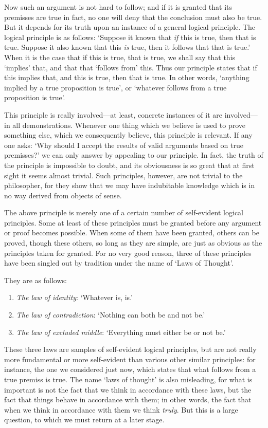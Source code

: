 \documentclass[oneside,letterpaper,12pt]{book}
\begin{document}
Now such an argument is not hard to follow; and if it is granted that
its premisses are true in fact, no one will deny that the conclusion
must also be true. But it depends for its truth upon an instance of a
general logical principle. The logical principle is as follows:
`Suppose it known that \emph{if} this is true, then that
is true. Suppose it also known that this \emph{is} true, then it follows
that that is true.' When it is the case that if this is
true, that is true, we shall say that this
`implies' that, and that that
`follows from' this. Thus our principle
states that if this implies that, and this is true, then that is true.
\label{mp} In other words, `anything implied by a true proposition
is true', or `whatever follows from a
true proposition is true'.

This principle is really involved---at least, concrete instances of it
are involved---in all demonstrations. Whenever one thing which we
believe is used to prove something else, which we consequently believe,
this principle is relevant. If any one asks: `Why should
I accept the results of valid arguments based on true
premisses?' we can only answer by appealing to our
principle. In fact, the truth of the principle is impossible to doubt,
and its obviousness is so great that at first sight it seems almost
trivial. Such principles, however, are not trivial to the philosopher,
for they show that we may have indubitable knowledge which is in no way
derived from objects of sense.

The above principle is merely one of a certain number of self-evident
logical principles. Some at least of these principles must be granted
before any argument or proof becomes possible. When some of them have
been granted, others can be proved, though these others, so long as they
are simple, are just as obvious as the principles taken for granted. For
no very good reason, three of these principles have been singled out by
tradition under the name of `Laws of
Thought'.

They are as follows:
\begin{enumerate}
	\item \label{identity} \emph{The law of identity}: `Whatever is,
is.'
	\item \label{lnc} \emph{The law of contradiction}: `Nothing can both
be and not be.'
	\item \label{lem} \emph{The law of excluded middle}: `Everything must
either be or not be.'
\end{enumerate}
These three laws are samples of self-evident logical principles, but are
not really more fundamental or more self-evident than various other
similar principles: for instance, the one we considered just now, which
states that what follows from a true premiss is true. The name
`laws of thought' is also misleading,
for what is important is not the fact that we think in accordance with
these laws, but the fact that things behave in accordance with them; in
other words, the fact that when we think in accordance with them we
think \emph{truly}. But this is a large question, to which we must
return at a later stage.
\end{document}
